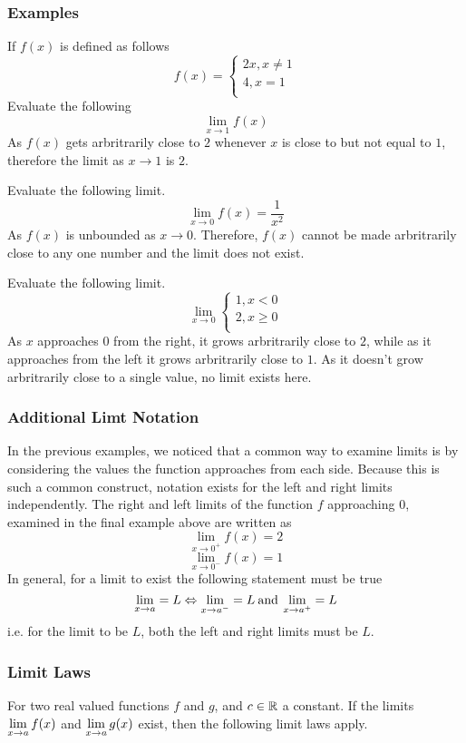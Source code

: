\documentclass[12pt]{report}
\begin{document}
\begin{flushleft}
\subsubsection*{Examples}
If \(f(x)\) is defined as follows 
\[
    f(x) =
    \begin{cases}
        2x, x \neq 1 \\
        4, x = 1 \\
    \end{cases}
\]
Evaluate the following
\[\lim_{x\rightarrow 1} f(x)\]
As \(f(x)\) gets arbritrarily close to \(2\) whenever \(x\) is close to but not
equal to \(1\), therefore the limit as \(x\rightarrow1\) is \(2\).

\bigskip\bigskip
Evaluate the following limit.
\[\lim_{x\rightarrow0}f(x) = \frac{1}{x^2}\]
As \(f(x)\) is unbounded as \(x\rightarrow0\). Therefore, \(f(x)\) cannot be 
made arbritrarily close to any one number and the limit does not exist.

\bigskip\bigskip
Evaluate the following limit.
\[
    \lim_{x\rightarrow0}
    \begin{cases}
        1, x < 0 \\
        2, x \geq 0 \\
    \end{cases}
\]
As \(x\) approaches \(0\) from the right, it grows arbritrarily close to \(2\),
while as it approaches from the left it grows arbritrarily close to \(1\). As 
it doesn't grow arbritrarily close to a single value, no limit exists here.

\subsubsection*{Additional Limt Notation}
In the previous examples, we noticed that a common way to examine limits is by
considering the values the function approaches from each side. Because this is
such a common construct, notation exists for the left and right limits
independently. The right and left limits of the function \(f\) approaching 
\(0\), examined in the final example above are written as
\[\lim_{x\rightarrow0^+}f(x) = 2\]
\[\lim_{x\rightarrow0^-}f(x) = 1\]
In general, for a limit to exist the following statement must be true
\[\lim_{x\rightarrow a} = L \Leftrightarrow \lim_{x\rightarrow a^-} = L
\:\mathrm{and}\: \lim_{x\rightarrow a^+} = L\]
i.e. for the limit to be \(L\), both the left and right limits must be \(L\).

\subsubsection*{Limit Laws}
For two real valued functions \(f\) and \(g\), and \(c \in \mathbb{R}\) a constant. If
the limits \(\lim\limits_{x\rightarrow a} f(x)\) and 
\(\lim\limits_{x\rightarrow a} g(x)\) exist, then the following limit laws 
apply.


\end{flushleft}
\end{document}
